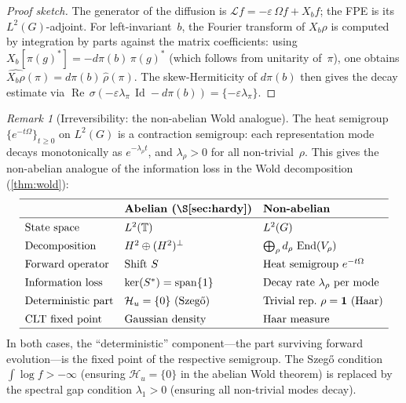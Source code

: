 \documentclass[12pt]{amsart}
\theoremstyle{definition}
\theoremstyle{remark}
\newtheorem*{remark}{Remark}
\newcommand{\bT}{\mathbb{T}}
\newcommand{\Htwo}{H^2}
\begin{document}
\begin{proof}[Proof sketch]
The generator of the diffusion is $\mathcal{L}f = -\varepsilon\,\Omega f + X_b f$; the FPE is its $L^2(G)$-adjoint. For left-invariant~$b$, the Fourier transform of $X_b\rho$ is computed by integration by parts against the matrix coefficients: using $X_b[\pi(g)^*] = -d\pi(b)\,\pi(g)^*$ (which follows from unitarity of~$\pi$), one obtains $\widehat{X_b\rho}(\pi) = d\pi(b)\,\widehat{\rho}(\pi)$. The skew-Hermiticity of $d\pi(b)$ then gives the decay estimate via $\operatorname{Re}\,\sigma(-\varepsilon\lambda_\pi\,\operatorname{Id} - d\pi(b)) = \{-\varepsilon\lambda_\pi\}$.
\end{proof}

\begin{remark}[Irreversibility: the non-abelian Wold analogue]
The heat semigroup $\{e^{-t\Omega}\}_{t \geq 0}$ on $L^2(G)$ is a contraction semigroup: each representation mode decays monotonically as $e^{-\lambda_\rho t}$, and $\lambda_\rho > 0$ for all non-trivial~$\rho$. This gives the non-abelian analogue of the information loss in the Wold decomposition (\cref{thm:wold}):
\[
\renewcommand{\arraystretch}{1.4}
\begin{array}{lll}
\hline
& \textbf{Abelian (\S\ref{sec:hardy})} & \textbf{Non-abelian} \\
\hline
\text{State space} & L^2(\bT) & L^2(G) \\
\text{Decomposition} & \Htwo \oplus (\Htwo)^\perp & \bigoplus_\rho d_\rho\, \operatorname{End}(V_\rho) \\
\text{Forward operator} & \text{Shift } S & \text{Heat semigroup } e^{-t\Omega} \\
\text{Information loss} & \ker(S^*) = \operatorname{span}\{1\} & \text{Decay rate } \lambda_\rho \text{ per mode} \\
\text{Deterministic part} & \mathcal{H}_u = \{0\} \text{ (Szeg\H{o})} & \text{Trivial rep.\ } \rho = \mathbf{1} \text{ (Haar)} \\
\text{CLT fixed point} & \text{Gaussian density} & \text{Haar measure} \\
\hline
\end{array}
\]
In both cases, the ``deterministic'' component---the part surviving forward evolution---is the fixed point of the respective semigroup. The Szeg\H{o} condition $\int \log f > -\infty$ (ensuring $\mathcal{H}_u = \{0\}$ in the abelian Wold theorem) is replaced by the spectral gap condition $\lambda_1 > 0$ (ensuring all non-trivial modes decay).
\end{remark}
\end{document}
